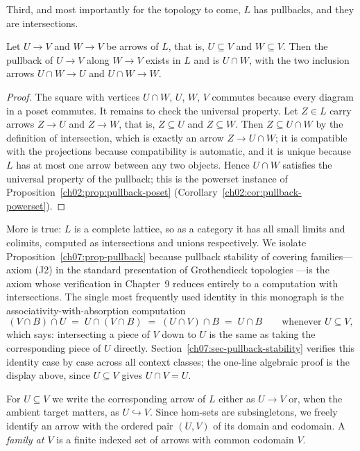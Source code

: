 Third, and most importantly for the topology to come, $L$ has pullbacks, and they are intersections.

\begin{proposition}\label{ch07:prop-pullback}
Let $U\to V$ and $W\to V$ be arrows of $L$, that is, $U\subseteq V$ and $W\subseteq V$. Then the pullback of $U\to V$ along $W\to V$ exists in $L$ and is $U\cap W$, with the two inclusion arrows $U\cap W\to U$ and $U\cap W\to W$.
\end{proposition}

\begin{proof}
The square with vertices $U\cap W$, $U$, $W$, $V$ commutes because every diagram in a poset commutes. It remains to check the universal property. Let $Z\in L$ carry arrows $Z\to U$ and $Z\to W$, that is, $Z\subseteq U$ and $Z\subseteq W$. Then $Z\subseteq U\cap W$ by the definition of intersection, which is exactly an arrow $Z\to U\cap W$; it is compatible with the projections because compatibility is automatic, and it is unique because $L$ has at most one arrow between any two objects. Hence $U\cap W$ satisfies the universal property of the pullback; this is the powerset instance of Proposition~\ref{ch02:prop:pullback-poset} (Corollary~\ref{ch02:cor:pullback-powerset}).
\end{proof}

\begin{remark}\label{ch07:rem-complete}
More is true: $L$ is a complete lattice, so as a category it has all small limits and colimits, computed as intersections and unions respectively. We isolate Proposition~\ref{ch07:prop-pullback} because pullback stability of covering families---axiom (J2) in the standard presentation of Grothendieck topologies \cite{stacks00Z4, johnstone}---is the axiom whose verification in Chapter~9 reduces entirely to a computation with intersections. The single most frequently used identity in this monograph is the associativity-with-absorption computation
\[
(V\cap B)\cap U \;=\; U\cap (V\cap B)\;=\; (U\cap V)\cap B \;=\; U\cap B
\qquad\text{whenever } U\subseteq V,
\]
which says: intersecting a piece of $V$ down to $U$ is the same as taking the corresponding piece of $U$ directly. Section~\ref{ch07:sec-pullback-stability} verifies this identity case by case across all context classes; the one-line algebraic proof is the display above, since $U\subseteq V$ gives $U\cap V=U$.
\end{remark}

\begin{notation}\label{ch07:not-arrows}
For $U\subseteq V$ we write the corresponding arrow of $L$ either as $U\to V$ or, when the ambient target matters, as $U\hookrightarrow V$. Since hom-sets are subsingletons, we freely identify an arrow with the ordered pair $(U,V)$ of its domain and codomain. A \emph{family at $V$} is a finite indexed set of arrows with common codomain $V$.
\end{notation}

